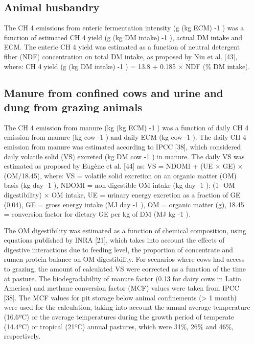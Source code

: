 \documentclass[11pt,a4paper]{article}
\begin{document}
\subsection{Animal husbandry}

The CH 4 emissions from enteric fermentation intensity (g (kg ECM) -1 ) was a function of estimated CH 4 yield (g (kg DM intake) -1 ), actual DM intake and ECM. The enteric CH 4 yield was estimated as a function of neutral detergent fiber (NDF) concentration on total DM intake, as proposed by Niu et al. [43], where: CH 4 yield (g (kg DM intake) -1 ) = 13.8 + 0.185 × NDF (\% DM intake).

\subsection{Manure from confined cows and urine and dung from grazing animals}

The CH 4 emission from manure (kg (kg ECM) -1 ) was a function of daily CH 4 emission from manure (kg cow -1 ) and daily ECM (kg cow -1 ). The daily CH 4 emission from manure was estimated according to IPCC [38], which considered daily volatile solid (VS) excreted (kg DM cow -1 ) in manure. The daily VS was estimated as proposed by Eugène et al. [44] as: VS = NDOMI + (UE × GE) × (OM/18.45), where: VS = volatile solid excretion on an organic matter (OM) basis (kg day -1 ), NDOMI = non-digestible OM intake (kg day -1 ): (1- OM digestibility) × OM intake, UE = urinary energy excretion as a fraction of GE (0.04), GE = gross energy intake (MJ day -1 ), OM = organic matter (g), 18.45 = conversion factor for dietary GE per kg of DM (MJ kg -1 ).

The OM digestibility was estimated as a function of chemical composition, using equations published by INRA [21], which takes into account the effects of digestive interactions due to feeding level, the proportion of concentrate and rumen protein balance on OM digestibility. For scenarios where cows had access to grazing, the amount of calculated VS were corrected as a function of the time at pasture. The biodegradability of manure factor (0.13 for dairy cows in Latin America) and methane conversion factor (MCF) values were taken from IPCC [38]. The MCF values for pit storage below animal confinements (> 1 month) were used for the calculation, taking into account the annual average temperature (16.6ºC) or the average temperatures during the growth period of temperate (14.4ºC) or tropical (21ºC) annual pastures, which were 31\%, 26\% and 46\%, respectively.
\end{document}

